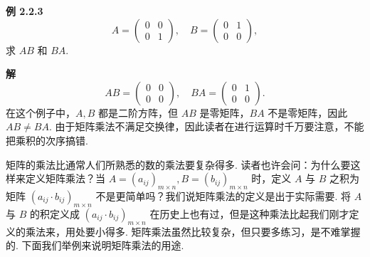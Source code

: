 \documentclass[UTF8, 12pt, fontset=fandol, oneside]{ctexart}
\begin{document}
\noindent\textbf{例 2.2.3}\quad
\[
A=\left(\begin{array}{cc}
0 & 0\\
0 & 1
\end{array}\right),\quad
B=\left(\begin{array}{cc}
0 & 1\\
0 & 0
\end{array}\right),
\]
求 $AB$ 和 $BA$.

\noindent\textbf{解}\quad
\[
AB=\left(\begin{array}{cc}
0 & 0\\
0 & 0
\end{array}\right),\quad
BA=\left(\begin{array}{cc}
0 & 1\\
0 & 0
\end{array}\right).
\]
在这个例子中，$A,B$ 都是二阶方阵，但 $AB$ 是零矩阵，$BA$ 不是零矩阵，因此 $AB\ne BA$. 由于矩阵乘法不满足交换律，因此读者在进行运算时千万要注意，不能把乘积的次序搞错.

矩阵的乘法比通常人们所熟悉的数的乘法要复杂得多. 读者也许会问：为什么要这样来定义矩阵乘法？当 $A=(a_{ij})_{m\times n}, B=(b_{ij})_{m\times n}$ 时，定义 $A$ 与 $B$ 之积为矩阵 $(a_{ij}\cdot b_{ij})_{m\times n}$ 不是更简单吗？我们说矩阵乘法的定义是出于实际需要. 将 $A$ 与 $B$ 的积定义成 $(a_{ij}\cdot b_{ij})_{m\times n}$ 在历史上也有过，但是这种乘法比起我们刚才定义的乘法来，用处要小得多. 矩阵乘法虽然比较复杂，但只要多练习，是不难掌握的. 下面我们举例来说明矩阵乘法的用途.
\end{document}
